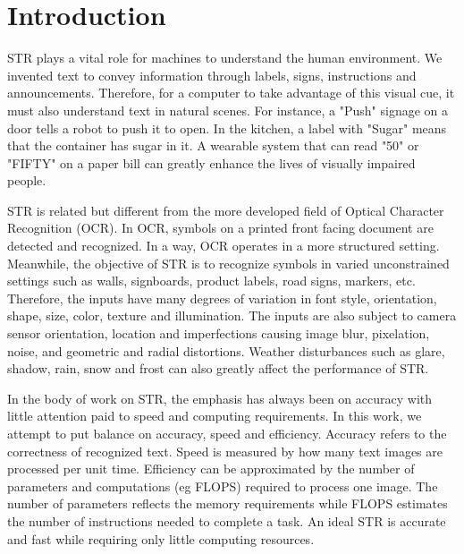 \documentclass[runningheads]{llncs}
\begin{document}
\section{Introduction}
STR plays a vital role for machines to understand the human environment. We invented text to convey information through labels, signs, instructions and announcements. Therefore, for a computer to take advantage of this visual cue, it must also understand text in natural scenes. For instance, a "Push" signage on a door tells a robot to push it to open. In the kitchen, a label with "Sugar" means that the container has sugar in it. A wearable system that can read "50" or "FIFTY" on a paper bill can greatly enhance the lives of visually impaired people.

STR is related but different from the more developed field of Optical Character Recognition (OCR). In OCR, symbols on a printed front facing document are detected and recognized. In a way, OCR operates in a more structured setting. Meanwhile, the objective of STR is to recognize symbols in varied unconstrained settings such as walls, signboards, product labels, road signs, markers, etc. Therefore, the inputs have many degrees of variation in font style, orientation, shape, size, color, texture and illumination. The inputs are also subject to camera sensor orientation, location and imperfections causing image blur, pixelation, noise, and geometric and radial distortions. Weather disturbances such as glare, shadow, rain, snow and frost can also greatly affect the performance of STR.

In the body of work on STR, the emphasis has always been on accuracy with little attention paid to speed and computing requirements. In this work, we attempt to put balance on accuracy, speed and efficiency. Accuracy refers to the correctness of recognized text. Speed is measured by how many text images are processed per unit time. Efficiency can be approximated by the number of parameters and computations (eg FLOPS) required to process one image. The number of parameters reflects the memory requirements while FLOPS estimates the number of instructions needed to complete a task. An ideal STR is accurate and fast while requiring only little computing resources.
\end{document}
